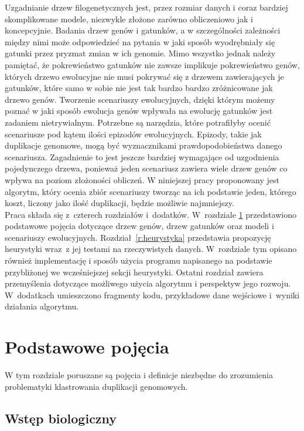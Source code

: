 \documentclass[licencjacka]{pracamgr}
\begin{document}
Uzgadnianie drzew filogenetycznych jest, przez rozmiar danych i coraz bardziej skomplikowane modele, niezwykle złożone zarówno obliczeniowo jak i koncepcyjnie. Badania drzew genów i gatunków, a w szczególności zależności między nimi może odpowiedzieć na pytania w jaki sposób wyodrębniały się gatunki przez pryzmat zmian w ich genomie. Mimo wszystko jednak należy pamiętać, że pokrewieństwo gatunków nie zawsze implikuje pokrewieństwo genów, których drzewo ewolucyjne nie musi pokrywać się z drzewem zawierających je gatunków, które samo w sobie nie jest tak bardzo bardzo zróżnicowane jak drzewo genów. Tworzenie scenariuszy ewolucyjnych, dzięki którym możemy poznać w jaki sposób ewolucja genów wpływała na ewolucję gatunków jest zadaniem nietrywialnym. Potrzebne są narzędzia, które potrafiłyby ocenić scenariusze pod kątem ilości epizodów ewolucyjnych. Epizody, takie jak duplikacje genomowe, mogą być wyznacznikami prawdopodobieństwa danego scenariusza. Zagadnienie to jest jeszcze bardziej wymagające od uzgodnienia pojedynczego drzewa, ponieważ jeden scenariusz zawiera wiele drzew genów co wpływa na poziom złożoności obliczeń. W niniejszej pracy proponowany jest algorytm, który ocenia zbiór scenariuszy tworząc na ich podstawie jeden, którego koszt, liczony jako ilość duplikacji, będzie możliwie najmniejszy.
\\
Praca składa się z~czterech rozdziałów i~dodatków.
W~rozdziale \ref{r:pojecia} przedstawiono podstawowe pojęcia dotyczące drzew genów, drzew gatunków oraz modeli i scenariuszy ewolucyjnych.  
Rozdział~\ref{r:heurystyka} przedstawia propozycję heurystyki wraz~z jej testami na rzeczywistych danych.  W~rozdziale tym opisano również implementację i sposób użycia programu napisanego na podstawie przybliżonej we wcześniejszej sekcji heurystyki.
Ostatni rozdział zawiera przemyślenia dotyczące możliwego użycia algorytmu i perspektyw jego rozwoju. W~dodatkach umieszczono fragmenty kodu, przykładowe dane wejściowe i~wyniki działania algorytmu.

\chapter{Podstawowe pojęcia}\label{r:pojecia}

W tym rozdziale poruszane są pojęcia i definicje niezbędne do zrozumienia problematyki klastrowania duplikacji genomowych. 
\section{Wstęp biologiczny}
\end{document}
